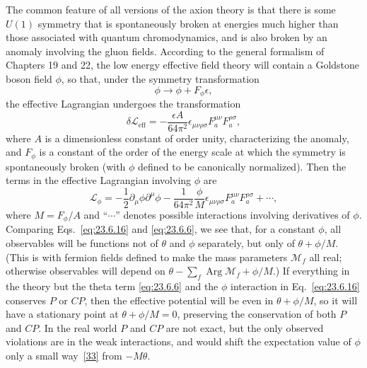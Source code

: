 The common feature of all versions of the axion theory is that there is
some $U(1)$ symmetry that is spontaneously broken at energies much
higher than those associated with quantum chromodynamics, and is also
broken by an anomaly involving the gluon fields. According to the
general formalism of Chapters 19 and 22, the low energy effective field
theory will contain a Goldstone boson field $\phi$, so that, under the
symmetry transformation
\begin{equation}
\phi\longrightarrow\phi+F_\phi\epsilon,
\tag{23.6.14}\label{eq:23.6.14}
\end{equation}
the effective Lagrangian undergoes the transformation
\begin{equation}
\delta\mathcal L_{\mathrm{eff}}=
-\frac{\epsilon A}{64\pi^2}
\epsilon_{\mu\nu\rho\sigma}F_a^{\mu\nu}F_a^{\rho\sigma},
\tag{23.6.15}\label{eq:23.6.15}
\end{equation}
where $A$ is a dimensionless constant of order unity, characterizing the
anomaly, and $F_\phi$ is a constant of the order of the energy scale at
which the symmetry is spontaneously broken (with $\phi$ defined to be
canonically normalized). Then the terms in the effective Lagrangian
involving $\phi$ are
\begin{equation}
\mathcal L_\phi=-\frac12\partial_\mu\phi\partial^\mu\phi
-\frac{1}{64\pi^2}\frac{\phi}{M}
\epsilon_{\mu\nu\rho\sigma}F_a^{\mu\nu}F_a^{\rho\sigma}
+\cdots,
\tag{23.6.16}\label{eq:23.6.16}
\end{equation}
where $M=F_\phi/A$ and ``$\cdots$'' denotes possible interactions
involving derivatives of $\phi$. Comparing Eqs.~\eqref{eq:23.6.16} and
\eqref{eq:23.6.6}, we see that, for a constant $\phi$, all observables
will be functions not of $\theta$ and $\phi$ separately, but only of
$\theta+\phi/M$. (This is with fermion fields defined to make the mass
parameters $\mathcal M_f$ all real; otherwise observables will depend on
$\theta-\sum_f\operatorname{Arg}\mathcal M_f+\phi/M$.) If everything in
the theory but the theta term \eqref{eq:23.6.6} and the $\phi$ interaction
in Eq.~\eqref{eq:23.6.16} conserves $P$ or $CP$, then the effective
potential will be even in $\theta+\phi/M$, so it will have a stationary
point at $\theta+\phi/M=0$, preserving the conservation of both $P$ and
$CP$. In the real world $P$ and $CP$ are not exact, but the only observed
violations are in the weak interactions, and would shift the expectation
value of $\phi$ only a small way~\hyperref[ch23-ref-33]{[33]} from
$-M\theta$.

